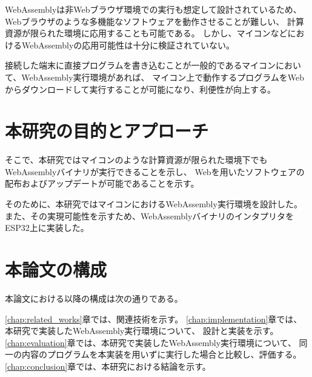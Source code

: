 WebAssemblyは非Webブラウザ環境での実行も想定して設計されているため、
Webブラウザのような多機能なソフトウェアを動作させることが難しい、
計算資源が限られた環境に応用することも可能である。
しかし、マイコンなどにおけるWebAssemblyの応用可能性は十分に検証されていない。

接続した端末に直接プログラムを書き込むことが一般的であるマイコンにおいて、WebAssembly実行環境があれば、
マイコン上で動作するプログラムをWebからダウンロードして実行することが可能になり、利便性が向上する。

\section{本研究の目的とアプローチ}

そこで、本研究ではマイコンのような計算資源が限られた環境下でもWebAssemblyバイナリが実行できることを示し、
Webを用いたソフトウェアの配布およびアップデートが可能であることを示す。

そのために、本研究ではマイコンにおけるWebAssembly実行環境を設計した。
また、その実現可能性を示すため、WebAssemblyバイナリのインタプリタをESP32上に実装した。

\section{本論文の構成}

本論文における以降の構成は次の通りである。

\ref{chap:related_works}章では、関連技術を示す。
\ref{chap:implementation}章では、本研究で実装したWebAssembly実行環境について、
設計と実装を示す。
\ref{chap:evaluation}章では、本研究で実装したWebAssembly実行環境について、
同一の内容のプログラムを本実装を用いずに実行した場合と比較し、評価する。
\ref{chap:conclusion}章では、本研究における結論を示す。
